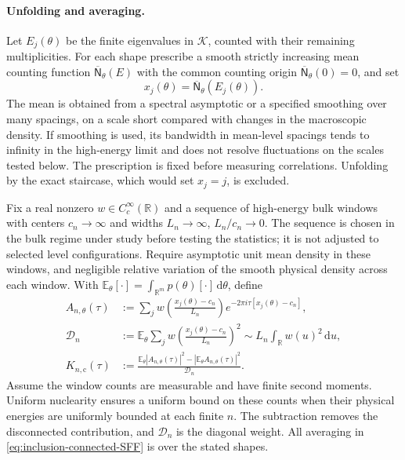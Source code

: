 \documentclass[a4paper,11pt]{article}
\theoremstyle{definition}
\begin{document}
\paragraph{Unfolding and averaging.}
Let $E_j(\theta)$ be the finite eigenvalues in $\mathcal K$, counted with their remaining multiplicities. For each shape prescribe a smooth strictly increasing mean counting function $\overline{\mathsf N}_\theta(E)$ with the common counting origin $\overline{\mathsf N}_\theta(0)=0$, and set
\begin{equation}
 x_j(\theta)=\overline{\mathsf N}_\theta(E_j(\theta)).
 \label{eq:inclusion-unfolding}
\end{equation}
The mean is obtained from a spectral asymptotic or a specified smoothing over many spacings, on a scale short compared with changes in the macroscopic density. If smoothing is used, its bandwidth in mean-level spacings tends to infinity in the high-energy limit and does not resolve fluctuations on the scales tested below. The prescription is fixed before measuring correlations. Unfolding by the exact staircase, which would set $x_j=j$, is excluded.

Fix a real nonzero $w\in C_c^\infty(\mathbb R)$ and a sequence of high-energy bulk windows with centers $c_n\to\infty$ and widths $L_n\to\infty$, $L_n/c_n\to0$. The sequence is chosen in the bulk regime under study before testing the statistics; it is not adjusted to selected level configurations. Require asymptotic unit mean density in these windows, and negligible relative variation of the smooth physical density across each window. With
$\mathbb E_\theta[\cdot]=\int_{\mathbb R^m}p(\theta)[\cdot]\,\mathrm d\theta$, define
\begin{align}
 A_{n,\theta}(\tau)
   &:=\sum_j w\!\left(\frac{x_j(\theta)-c_n}{L_n}\right)
                e^{-2\pi i\tau[x_j(\theta)-c_n]},\nonumber\\
 \mathcal D_n
   &:=\mathbb E_\theta\sum_j
           w\!\left(\frac{x_j(\theta)-c_n}{L_n}\right)^2
     \sim L_n\int_{\mathbb R}w(u)^2\,\mathrm du,\nonumber\\
 K_{n,\mathrm c}(\tau)
   &:=\frac{\mathbb E_\theta|A_{n,\theta}(\tau)|^2
                -|\mathbb E_\theta A_{n,\theta}(\tau)|^2}{\mathcal D_n}.
 \label{eq:inclusion-connected-SFF}
\end{align}
Assume the window counts are measurable and have finite second moments. Uniform nuclearity ensures a uniform bound on these counts when their physical energies are uniformly bounded at each finite $n$. The subtraction removes the disconnected contribution, and $\mathcal D_n$ is the diagonal weight. All averaging in \eqref{eq:inclusion-connected-SFF} is over the stated shapes.
\end{document}
